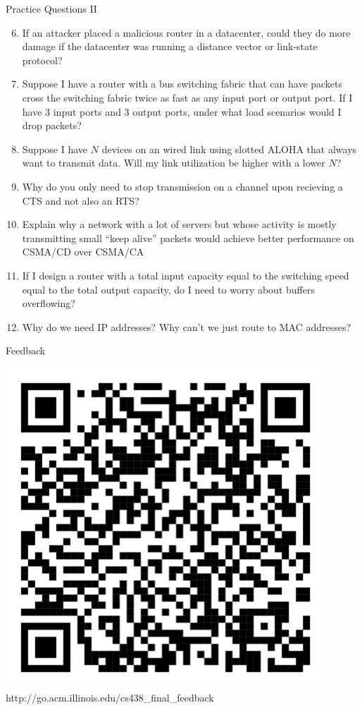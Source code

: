 \documentclass{beamer}
\begin{document}
\begin{frame}[t]{Practice Questions II}
    \begin{enumerate}
        \setcounter{enumi}{5}
        \item If an attacker placed a malicious router in a datacenter, could they do more damage if the datacenter was running a distance vector or link-state protocol?
        \pause\item Suppose I have a router with a bus switching fabric that can have packets cross the switching fabric twice as fast as any input port or output port. If I have 3 input ports and 3 output ports, under what load scenarios would I drop packets?
        \pause\item Suppose I have $N$ devices on an wired link using slotted ALOHA that always want to transmit data. Will my link utilization be higher with a lower $N$?
        \pause\item Why do you only need to stop transmission on a channel upon recieving a CTS and not also an RTS?
        \pause\item Explain why a network with a lot of servers but whose activity is mostly transmitting small ``keep alive'' packets would achieve better performance on CSMA/CD over CSMA/CA
        \pause\item If I design a router with a total input capacity equal to the switching speed equal to the total output capacity, do I need to worry about buffers overflowing?
        \pause\item Why do we need IP addresses? Why can't we just route to MAC addresses?
        
    \end{enumerate}
\end{frame}

\begin{frame}[t]{Feedback}
    \begin{center}
        \includegraphics[height=12cm]{feedback.png}
        http://go.acm.illinois.edu/cs438\_final\_feedback	
    \end{center}
\end{frame}
\end{document}
